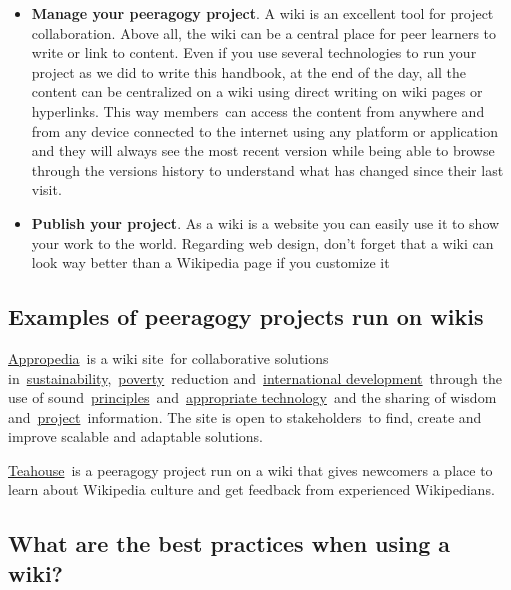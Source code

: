 \begin{itemize}
\item
  \textbf{Manage your peeragogy project}. A wiki is an excellent tool
  for project collaboration. Above all, the wiki can be a central place
  for peer learners to write or link to content. Even if you use several
  technologies to run your project as we did to write this handbook, at
  the end of the day, all the content can be centralized on a wiki using
  direct writing on wiki pages or hyperlinks. This way members~can
  access the content from anywhere and from any device connected to the
  internet using any platform or application and they will always see
  the most recent version while being able to browse through the
  versions history to understand what has changed since their last
  visit.
\end{itemize}

\begin{itemize}
\item
  \textbf{Publish your project}. As a wiki is a website you can easily
  use it to show your work to the world. Regarding web design, don't
  forget that a wiki can look way better than a Wikipedia page if you
  customize it
\end{itemize}

\subsection{Examples of peeragogy projects run on wikis}

\href{http://www.appropedia.org/Welcome\_to\_Appropedia}{Appropedia}~is
a wiki site~for collaborative solutions
in~\href{http://www.appropedia.org/Sustainability}{sustainability},~\href{http://www.appropedia.org/Poverty}{poverty}~reduction
and~\href{http://www.appropedia.org/International\_development}{international
  development}~through the use of
sound~\href{http://www.appropedia.org/Principles}{principles}~and~\href{http://www.appropedia.org/Appropriate\_technology}{appropriate
  technology}~and the sharing of wisdom
and~\href{http://www.appropedia.org/Project}{project}~information.
The site is open to stakeholders~to find, create and
improve scalable and adaptable solutions.

\href{http://en.wikipedia.org/wiki/Wikipedia:Teahouse}{Teahouse}~is a
peeragogy project run on a wiki that gives newcomers a place to learn
about Wikipedia culture and get feedback from experienced Wikipedians.

\subsection{What are the best practices when using a wiki?}

